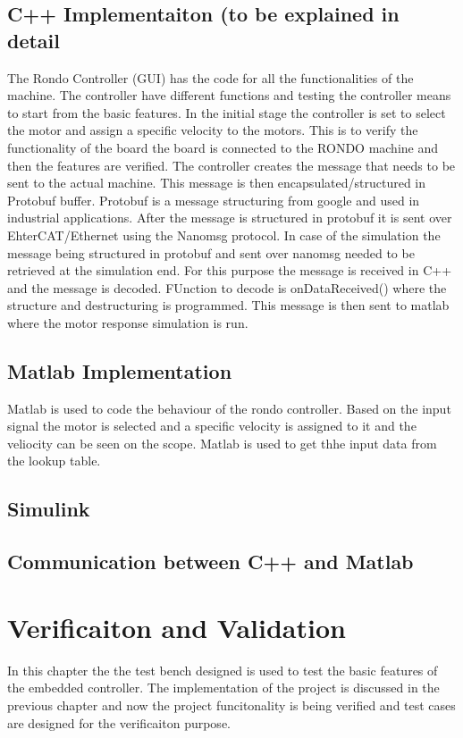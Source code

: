 \documentclass{listhesis}
\begin{document}
\section{C++ Implementaiton (to be explained in detail}
The Rondo Controller (GUI) has the code for all the functionalities of the machine. The controller have different functions and testing the controller means to start from the basic features. In the initial stage the controller is set to select the motor and assign a specific velocity to the motors. This is to
verify the functionality of the board the board is connected to the RONDO machine and then the features are verified. The controller creates the message that needs to be sent to the actual machine. This message is then encapsulated/structured in Protobuf buffer. Protobuf is a message structuring from google and used in industrial applications. After the message is structured in protobuf it is sent over EhterCAT/Ethernet using the Nanomsg protocol. In case of the simulation the message being structured in protobuf and sent over nanomsg needed to be retrieved at the simulation end. For this purpose the message is received in C++ and the message is decoded. FUnction to decode is onDataReceived() where the structure and destructuring is programmed. This message is then sent to matlab where the motor response simulation is run.




\section{Matlab Implementation}
Matlab is used to code the behaviour of the rondo controller. Based on the input signal the motor is selected and a specific velocity is assigned to it and the veliocity can be seen on the scope. Matlab is used to get thhe input data from the lookup table. 
\section{Simulink}
\section{Communication between C++ and Matlab}


\chapter{Verificaiton and Validation}
In this chapter the the test bench designed is used to test the basic features of the embedded controller. The implementation of the project is discussed in the previous chapter and now the project funcitonality is being verified and test cases are designed for the verificaiton purpose. 
\end{document}
